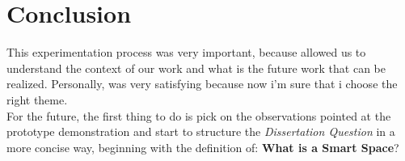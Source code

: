 \documentclass[12pt, twocolumn]{article}
\begin{document}
 \section{Conclusion}
 This experimentation process was very important, because allowed us to understand the context of our work and what is the future work that can be realized. Personally, was very satisfying because now i'm sure that i choose the right theme.\\
 For the future, the first thing to do is pick on the observations pointed at the prototype demonstration and start to structure the \textit{Dissertation Question} in a more concise way, beginning with the definition of: \textbf{What is a Smart Space}? 
\end{document}
